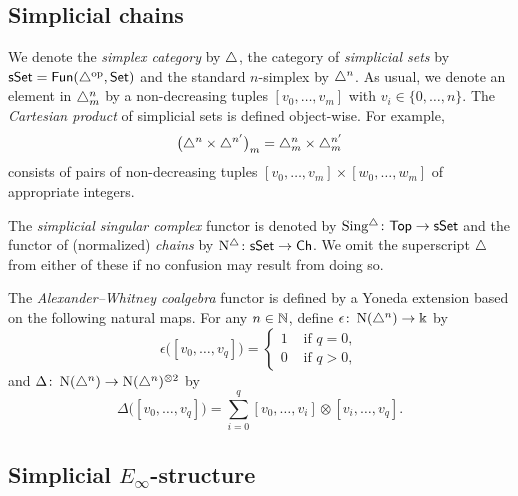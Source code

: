 
\subsection{Simplicial chains}

We denote the \textit{simplex category} by $\triangle$, the category of \textit{simplicial sets} by $\mathsf{sSet} = \mathsf{Fun}(\triangle^{\mathrm{op}}, \mathsf{Set})$ and the standard $n$-simplex by $\triangle^n$.
As usual, we denote an element in $\triangle^n_m$ by a non-decreasing tuples $[v_0, \dots, v_m]$ with $v_i \in \{0, \dots, n\}$.
The \textit{Cartesian product} of simplicial sets is defined object-wise.
For example,
\[
\big(\triangle^n \times \triangle^{n^\prime}\big)_m = \triangle^n_m \times \triangle^{n^\prime}_m
\]
consists of pairs of non-decreasing tuples $[v_0, \dots, v_m] \times [w_0, \dots, w_m]$ of appropriate integers.

The \textit{simplicial singular complex} functor is denoted by $\operatorname{Sing^{\triangle}} \colon \mathsf{Top} \to \mathsf{sSet}$ and the functor of (normalized) \textit{chains} by $\operatorname{N^{\triangle}} \colon \mathsf{sSet} \to \mathsf{Ch}$.
We omit the superscript $\triangle$ from either of these if no confusion may result from doing so.

The \textit{Alexander--Whitney coalgebra} functor is defined by a Yoneda extension based on the following natural maps.
For any $n \in \mathbb{N}$, define $\epsilon \colon \operatorname{N}(\triangle^n) \to \Bbbk$ by
\[
\epsilon \big( [v_0, \dots, v_q] \big) = \begin{cases} 1 & \text{ if } q = 0, \\ 0 & \text{ if } q>0, \end{cases}
\]
and $\Delta \colon \operatorname{N}(\triangle^n) \to \operatorname{N}(\triangle^n)^{\otimes2}$ by
\[
\Delta \big( [v_0, \dots, v_q] \big) = \sum_{i=0}^q [v_0, \dots, v_i] \otimes [v_i, \dots, v_q].
\]

\subsection{Simplicial $E_\infty$-structure} \label{ss:e infinity structures}

